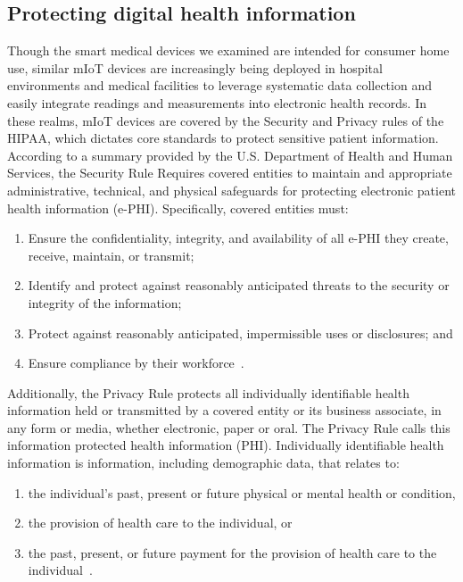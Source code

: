\subsection{Protecting digital health information}
Though the smart medical devices we examined are intended for consumer home use, similar mIoT devices are increasingly being deployed in hospital environments and medical facilities to leverage systematic data collection and easily integrate readings and measurements into electronic health records. In these realms, mIoT devices are covered by the Security and Privacy rules of the HIPAA, which dictates core standards to protect sensitive patient information. According to a summary provided by the U.S. Department of Health and Human Services, the Security Rule Requires covered entities to maintain and appropriate administrative, technical, and physical safeguards for protecting electronic patient health information (e-PHI). Specifically, covered entities must:

\begin{enumerate}
  \item Ensure the confidentiality, integrity, and availability of all e-PHI they create, receive, maintain, or transmit;
  \item Identify and protect against reasonably anticipated threats to the security or integrity of the information;
  \item Protect against reasonably anticipated, impermissible uses or disclosures; and
  \item Ensure compliance by their workforce~\cite{securityHIPAArule}.
\end{enumerate}

Additionally, the Privacy Rule protects all individually identifiable health information held or transmitted by a covered entity or its business associate, in any form or media, whether electronic, paper or oral. The Privacy Rule calls this information protected health information (PHI). Individually identifiable health information is information, including demographic data, that relates to:

\begin{enumerate}
  \item the individual's past, present or future physical or mental health or condition,
  \item the provision of health care to the individual, or
  \item the past, present, or future payment for the provision of health care to the individual~\cite{privacyHIPAArule}.
\end{enumerate}

